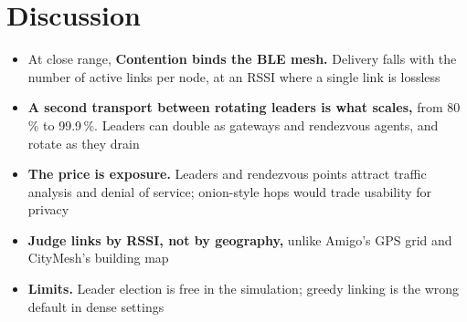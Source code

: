 \section{Discussion}
\begin{frame}{}
    \begin{itemize}
        \item At close range, \textbf{Contention binds the BLE mesh.} Delivery falls with the number of active links per node, at an RSSI where a single link is lossless
        \item \textbf{A second transport between rotating leaders is what scales,} from 80\,\% to 99.9\,\%. Leaders can double as gateways and rendezvous agents, and rotate as they drain
        \item \textbf{The price is exposure.} Leaders and rendezvous points attract traffic analysis and denial of service; onion-style hops would trade usability for privacy~\cite{Aceto2026}
        \item \textbf{Judge links by RSSI, not by geography,} unlike Amigo's GPS grid and CityMesh's building map~\cite{Inyangson2025, Liu2026}
        \item \textbf{Limits.} Leader election is free in the simulation; greedy linking is the wrong default in dense settings
    \end{itemize}
\end{frame}
